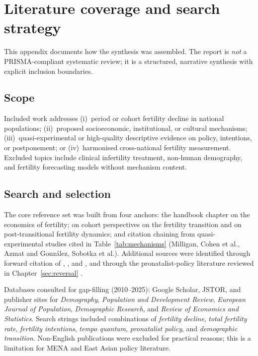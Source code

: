 \chapter{Literature coverage and search strategy}
\label{app:litsearch}

This appendix documents how the synthesis was assembled. The report is \emph{not} a PRISMA-compliant systematic review; it is a structured, narrative synthesis with explicit inclusion boundaries.

\section{Scope}

Included work addresses (i)~period or cohort fertility decline in national populations; (ii)~proposed socioeconomic, institutional, or cultural mechanisms; (iii)~quasi-experimental or high-quality descriptive evidence on policy, intentions, or postponement; or (iv)~harmonised cross-national fertility measurement. Excluded topics include clinical infertility treatment, non-human demography, and fertility forecasting models without mechanism content.

\section{Search and selection}

The core reference set was built from four anchors: the \citet{doepke2023} handbook chapter on the economics of fertility; \citet{frejka2017} on cohort perspectives on the fertility transition and \citet{sobotka2017} on post-transitional fertility dynamics; and citation chaining from quasi-experimental studies cited in Table~\ref{tab:mechanisms} (Milligan, Cohen et al., Azmat and Gonz{\'a}lez, Sobotka et al.). Additional sources were identified through forward citation of \citet{kohler2002}, \citet{morgan2003}, and \citet{lesthaeghe2010}, and through the pronatalist-policy literature reviewed in Chapter~\ref{sec:reversal} \citep{gauthier2007,sobotka2020,doepke2023}.

Databases consulted for gap-filling (2010--2025): Google Scholar, JSTOR, and publisher sites for \textit{Demography}, \textit{Population and Development Review}, \textit{European Journal of Population}, \textit{Demographic Research}, and \textit{Review of Economics and Statistics}. Search strings included combinations of \textit{fertility decline}, \textit{total fertility rate}, \textit{fertility intentions}, \textit{tempo quantum}, \textit{pronatalist policy}, and \textit{demographic transition}. Non-English publications were excluded for practical reasons; this is a limitation for MENA and East Asian policy literature.

